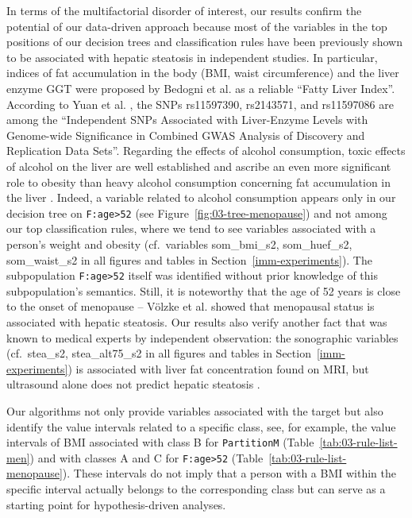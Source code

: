 \documentclass[
  oneside]{book}
\begin{document}
In terms of the multifactorial disorder of interest, our results confirm the potential of our data-driven approach because most of the variables in the top positions of our decision trees and classification rules have been previously shown to be associated with hepatic steatosis in independent studies.
In particular, indices of fat accumulation in the body (BMI, waist circumference) and the liver enzyme GGT were proposed by Bedogni et al. \autocite{BedogniEtAl:2006} as a reliable ``Fatty Liver Index''.
According to Yuan et al. \autocite{yuan2008population}, the SNPs rs11597390, rs2143571, and rs11597086 are among the ``Independent SNPs Associated with Liver-Enzyme Levels with Genome-wide Significance in Combined GWAS Analysis of Discovery and Replication Data Sets''.
Regarding the effects of alcohol consumption, toxic effects of alcohol on the liver are well established and ascribe an even more significant role to obesity than heavy alcohol consumption concerning fat accumulation in the liver \autocite{BaumeisterEtAl:2008,BellentaniEtAl:InternMed2000}.
Indeed, a variable related to alcohol consumption appears only in our decision tree on \texttt{F:age\textgreater{}52} (see Figure~\ref{fig:03-tree-menopause}) and not among our top classification rules, where we tend to see variables associated with a person's weight and obesity (cf.~variables som\_bmi\_s2, som\_huef\_s2, som\_waist\_s2 in all figures and tables in Section~\ref{imm-experiments}).
The subpopulation \texttt{F:age\textgreater{}52} itself was identified without prior knowledge of this subpopulation's semantics.
Still, it is noteworthy that the age of 52 years is close to the onset of menopause -- Völzke et al. \autocite{VoelzkeEtAl:Gut2007} showed that menopausal status is associated with hepatic steatosis.
Our results also verify another fact that was known to medical experts by independent observation: the sonographic variables (cf.~stea\_s2, stea\_alt75\_s2 in all figures and tables in Section~\ref{imm-experiments}) is associated with liver fat concentration found on MRI, but ultrasound alone does not predict hepatic steatosis \autocite{BellentaniEtAl:InternMed2000,BedogniEtAl:2006}.

Our algorithms not only provide variables associated with the target but also identify the value intervals related to a specific class, see, for example, the value intervals of BMI associated with class B for \texttt{PartitionM} (Table~\ref{tab:03-rule-list-men}) and with classes A and C for \texttt{F:age\textgreater{}52} (Table~\ref{tab:03-rule-list-menopause}).
These intervals do not imply that a person with a BMI within the specific interval actually belongs to the corresponding class but can serve as a starting point for hypothesis-driven analyses.
\end{document}
